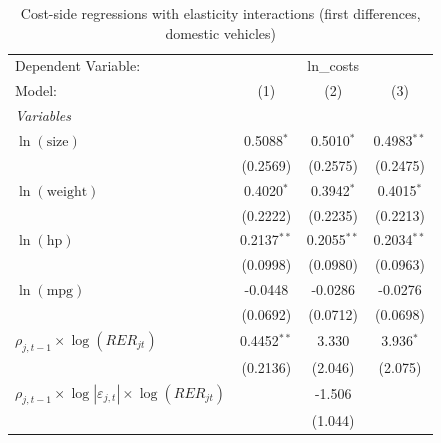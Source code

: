 
\begin{table}[htbp]
   \caption{\label{tab:cost_reg_elas_fd} Cost-side regressions with elasticity interactions (first differences, domestic vehicles)}
   \centering
   \begin{tabular}{lccc}
      \tabularnewline \midrule \midrule
      Dependent Variable: & \multicolumn{3}{c}{ln\_costs}\\
      Model:                                                                  & (1)            & (2)            & (3)\\
      \midrule
      \emph{Variables}\\
      $\ln(\text{size})$                                                      & 0.5088$^{*}$  & 0.5010$^{*}$  & 0.4983$^{**}$\\
                                                                              & (0.2569)      & (0.2575)      & (0.2475)\\
      $\ln(\text{weight})$                                                    & 0.4020$^{*}$  & 0.3942$^{*}$  & 0.4015$^{*}$\\
                                                                              & (0.2222)      & (0.2235)      & (0.2213)\\
      $\ln(\text{hp})$                                                        & 0.2137$^{**}$ & 0.2055$^{**}$ & 0.2034$^{**}$\\
                                                                              & (0.0998)      & (0.0980)      & (0.0963)\\
      $\ln(\text{mpg})$                                                       & -0.0448       & -0.0286       & -0.0276\\
                                                                              & (0.0692)      & (0.0712)      & (0.0698)\\
      $\rho_{j,t-1}\times\log(RER_{jt})$                                      & 0.4452$^{**}$ & 3.330         & 3.936$^{*}$\\
                                                                              & (0.2136)      & (2.046)       & (2.075)\\
      $\rho_{j,t-1}\times\log|\varepsilon_{j,t}|\times\log(RER_{jt})$         &               & -1.506        &   \\
                                                                              &               & (1.044)       &   \\

\end{tabular}
\end{table}

